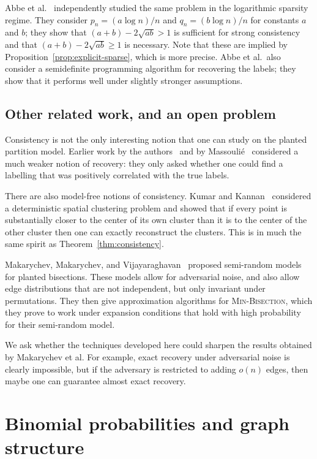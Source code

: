 \documentclass[EJP,final]{ejpecp}
\newcommand{\1}[1]{\mathbbm{1}_{\{#1\}}}
\begin{document}
Abbe et al.~\cite{AbBaHa:14} independently
studied the same problem in the logarithmic sparsity regime. They consider
$p_n = (a \log n)/n$ and $q_n = (b \log n) / n$ for constants $a$ and $b$;
they show that $(a+b) - 2\sqrt{ab} > 1$ is
sufficient for strong consistency and that
$(a+b) - 2\sqrt{ab} \ge 1$ is necessary. Note that these are implied
by Proposition~\ref{prop:explicit-sparse}, which is more precise. 
Abbe et al.\ also consider a semidefinite programming algorithm
for recovering the labels; they show that it performs well under
slightly stronger assumptions.

\subsection{Other related work, and an open problem}

Consistency is not the only interesting notion that one can study
on the planted partition model. Earlier work by the
authors~\cite{MoNeSl:13,MoNeSl:14} and by Massouli\'e~\cite{Massoulie:13}
considered a much weaker notion of recovery: they only asked whether
one could find a labelling that was positively correlated with the
true labels.

There are also model-free notions of consistency. Kumar and
Kannan~\cite{KumarKannan:10} considered a deterministic spatial clustering
problem and showed that if every point is substantially closer to the
center of its own cluster than it is to the center of the other cluster
then one can exactly reconstruct the clusters. This is in much the same
spirit as Theorem~\ref{thm:consistency}.

Makarychev, Makarychev, and Vijayaraghavan~\cite{MaMaVi:12,MaMaVi:14}
proposed semi-random models for planted bisections. These models
allow for adversarial noise, and also allow edge distributions that
are not independent, but only invariant under permutations.
They then give approximation algorithms for \textsc{Min-Bisection},
which they prove to work under expansion conditions that hold
with high probability for their semi-random model.

We ask whether the techniques developed here could sharpen the results
obtained by Makarychev et al. For example, exact recovery under adversarial
noise is clearly impossible, but if the adversary is restricted to adding $o(n)$
edges, then maybe one can guarantee almost exact recovery.



\section{Binomial probabilities and graph structure}
\end{document}
